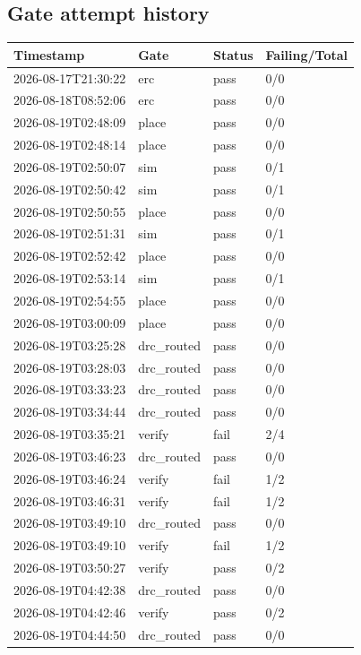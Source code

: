 \documentclass[11pt,a4paper]{article}
\begin{document}
\subsection*{Gate attempt history}
{\small
\begin{longtable}{llll}
\toprule
\textbf{Timestamp} & \textbf{Gate} & \textbf{Status} & \textbf{Failing/Total} \\
\midrule
\endhead
2026-08-17T21:30:22 & erc & pass & 0/0 \\
2026-08-18T08:52:06 & erc & pass & 0/0 \\
2026-08-19T02:48:09 & place & pass & 0/0 \\
2026-08-19T02:48:14 & place & pass & 0/0 \\
2026-08-19T02:50:07 & sim & pass & 0/1 \\
2026-08-19T02:50:42 & sim & pass & 0/1 \\
2026-08-19T02:50:55 & place & pass & 0/0 \\
2026-08-19T02:51:31 & sim & pass & 0/1 \\
2026-08-19T02:52:42 & place & pass & 0/0 \\
2026-08-19T02:53:14 & sim & pass & 0/1 \\
2026-08-19T02:54:55 & place & pass & 0/0 \\
2026-08-19T03:00:09 & place & pass & 0/0 \\
2026-08-19T03:25:28 & drc\_routed & pass & 0/0 \\
2026-08-19T03:28:03 & drc\_routed & pass & 0/0 \\
2026-08-19T03:33:23 & drc\_routed & pass & 0/0 \\
2026-08-19T03:34:44 & drc\_routed & pass & 0/0 \\
2026-08-19T03:35:21 & verify & fail & 2/4 \\
2026-08-19T03:46:23 & drc\_routed & pass & 0/0 \\
2026-08-19T03:46:24 & verify & fail & 1/2 \\
2026-08-19T03:46:31 & verify & fail & 1/2 \\
2026-08-19T03:49:10 & drc\_routed & pass & 0/0 \\
2026-08-19T03:49:10 & verify & fail & 1/2 \\
2026-08-19T03:50:27 & verify & pass & 0/2 \\
2026-08-19T04:42:38 & drc\_routed & pass & 0/0 \\
2026-08-19T04:42:46 & verify & pass & 0/2 \\
2026-08-19T04:44:50 & drc\_routed & pass & 0/0 \\

\end{longtable}}
\end{document}
